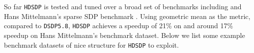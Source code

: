 So far {{\texttt{HDSDP}}} is tested and tuned over a broad set of benchmarks
including  {\cite{borchers1999sdplib}} and Hans
Mittelmann's sparse SDP benchmark {\cite{mittelmann2003independent}}. 
Using geometric mean as the metric, compared to {{\texttt{DSDP5.8}}}, {{\texttt{HDSDP}}} achieves a speedup of 21\% on  and around 17\% speedup on Hans Mittelmann's benchmark dataset. Below we list some example benchmark datasets of nice structure for {{\texttt{HDSDP}}} to exploit.
%

